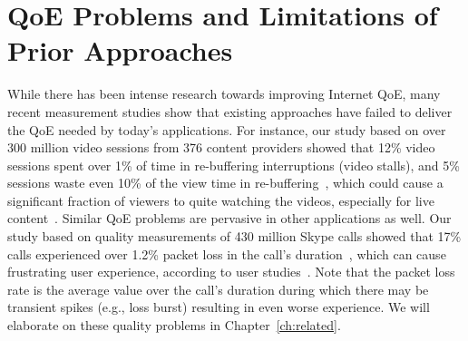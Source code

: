 \section{QoE Problems and Limitations of Prior Approaches}

While there has been intense research towards improving Internet QoE, 
many recent measurement studies show that existing approaches have failed 
to deliver the QoE needed by today's applications. 
For instance, our study based on over 300 million 
video sessions from 376 content providers showed that
12\% video sessions spent over 1\% of time in re-buffering interruptions (video stalls),
and 5\% sessions waste even 10\% of the view time in 
re-buffering~\cite{jiang2013shedding}, which could cause a significant 
fraction of viewers to quite watching the videos, especially for 
live content~\cite{sigcomm11}. 
Similar QoE problems are pervasive in other applications as well. 
Our study based on quality measurements of 430 million 
Skype calls showed that 17\% calls experienced over 
1.2\% packet loss in the call's duration~\cite{via}, which 
can cause frustrating user experience, according to user studies~\cite{itu,cisco-voip}.
Note that the packet loss rate is the average value over the
call's duration during which there may be transient spikes
(e.g., loss burst) resulting in even worse experience.
We will elaborate on these quality problems in Chapter~\ref{ch:related}.




